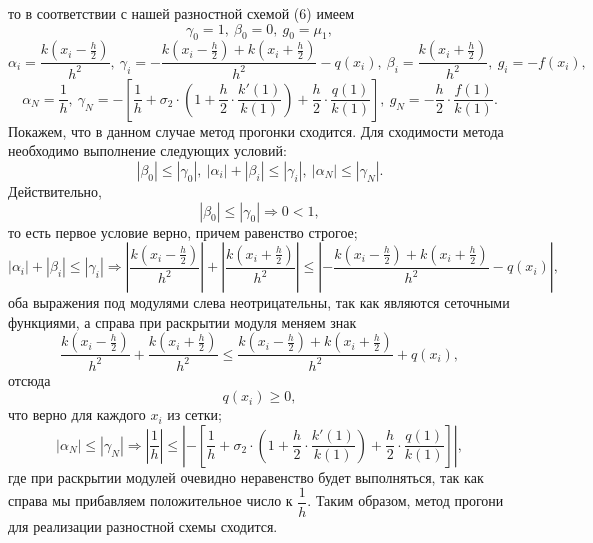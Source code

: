 \documentclass[a4paper, 12pt]{article}
\begin{document}
    то
    в соответствии с нашей разностной схемой (6) имеем
    $$\gamma_0 = 1,\ \beta_0 = 0,\ g_0 = \mu_1,$$
    $$\alpha_i = \dfrac{k(x_i - \frac h2)}{h^2},\ \gamma_i = -\dfrac{k(x_i - \frac h2) + k(x_i + \frac h2)}{h^2} - q(x_i), \ \beta_i =\dfrac{k(x_i + \frac h2)}{h^2},\ g_i = -f(x_i),$$
    $$\alpha_N = \dfrac 1 h,\ \gamma_N = -\left[\dfrac 1h + \sigma_2\cdot \left(1 + \dfrac h2 \cdot\dfrac { k'(1)}{ k(1)}\right) + \dfrac h 2 \cdot \dfrac {q(1)}{k(1)}\right],\ g_N = - \dfrac h 2 \cdot \dfrac {f(1)}{k(1)}.$$
    Покажем, что в данном случае метод прогонки сходится. Для сходимости метода необходимо выполнение следующих условий:
    $$|\beta_0| \leq |\gamma _0|,\ |\alpha_i| + |\beta_i|\leq |\gamma_i|,\ |\alpha_N|\leq |\gamma_N|.$$
    Действительно,
    $$|\beta_0| \leq |\gamma _0| \Rightarrow 0 < 1,$$
    то есть первое условие верно, причем равенство строгое;
    $$|\alpha_i| + |\beta_i|\leq |\gamma_i|\Rightarrow \left|\dfrac{k(x_i - \frac h2)}{h^2} \right| + \left| \dfrac{k(x_i + \frac h2)}{h^2}\right|\leq \left|-\dfrac{k(x_i - \frac h2) + k(x_i + \frac h2)}{h^2} - q(x_i) \right|,$$
    оба выражения под модулями слева неотрицательны, так как являются сеточными функциями, а справа при раскрытии модуля меняем знак
    $$\dfrac{k(x_i - \frac h2)}{h^2}  +  \dfrac{k(x_i + \frac h2)}{h^2}\leq \dfrac{k(x_i - \frac h2) + k(x_i + \frac h2)}{h^2} + q(x_i),$$
    отсюда
    $$q(x_i)\geq 0,$$
    что верно для каждого $x_i$ из сетки;
    $$|\alpha_N|\leq |\gamma_N| \Rightarrow \left|\dfrac 1 h\right|\leq \left| -\left[\dfrac 1h + \sigma_2\cdot \left(1 + \dfrac h2 \cdot\dfrac { k'(1)}{ k(1)}\right) + \dfrac h 2 \cdot \dfrac {q(1)}{k(1)}\right]\right|,$$
    где при раскрытии модулей очевидно неравенство будет выполняться, так как справа мы прибавляем положительное число к $\dfrac 1 h$. Таким образом, метод прогони для реализации разностной схемы сходится.
\end{document}
